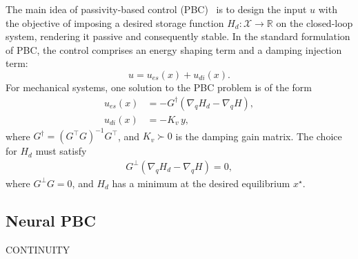 The main idea of passivity-based control (PBC)~\cite{van2000l2} is to design the
input $u$ with the objective of imposing a desired storage function $H_d:
\mathcal{X} \rightarrow \mathbb{R}$ on the closed-loop system, rendering it
passive and consequently stable.
%
In the standard formulation of PBC, the control comprises an
energy shaping term and a damping injection term:
%
\begin{equation}
  u = u_{es}(x) + u_{di}(x).
  \label{eq:ida-pbc_control}
\end{equation}
%
%
For mechanical systems, one solution to the PBC problem is of the form
%
\begin{align*}
  u_{es}(x) &= 
  -G^{\dagger}
  \left( \nabla_q H_d - \nabla_q H \right), \\
  u_{di}(x) &= - K_{v} \, y,%
\end{align*}
%
where $G^\dagger = \left( G^\top G  \right)^{-1} G^\top$, and $K_v \succ 0$ is the
damping gain matrix. The choice for $H_d$ must satisfy
%
\begin{align}
  G^\bot \left( \nabla_q H_d - \nabla_q H \right) = 0,
  \label{eq:pdes}
\end{align} 
%
where $G^\perp G = 0$, and $H_d$ has a minimum at the desired equilibrium
$x^\star$. 

\subsection{Neural PBC}

{\color{red} CONTINUITY}

